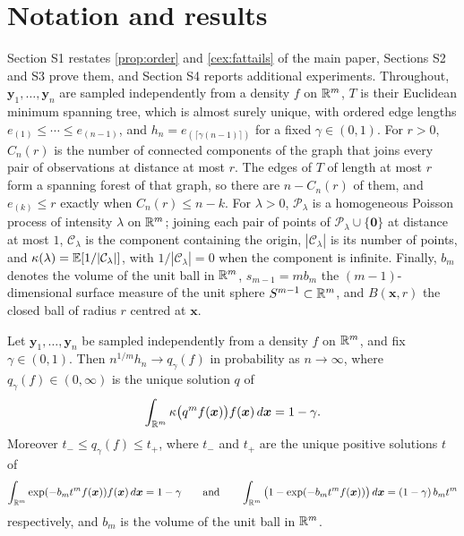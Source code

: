 \section{Notation and results}

Section S1 restates \cref{prop:order} and \cref{cex:fattails} of the main paper, Sections S2 and S3 prove them, and Section S4 reports additional experiments. Throughout, $\bm{y}_1,\dots,\bm{y}_n$ are sampled independently from a density $f$ on $\mathbb{R}^m$, $T$ is their Euclidean minimum spanning tree, which is almost surely unique, with ordered edge lengths $e_{(1)}\le\cdots\le e_{(n-1)}$, and $h_n=e_{(\lceil\gamma(n-1)\rceil)}$ for a fixed $\gamma\in(0,1)$. For $r>0$, $C_n(r)$ is the number of connected components of the graph that joins every pair of observations at distance at most $r$. The edges of $T$ of length at most $r$ form a spanning forest of that graph, so there are $n-C_n(r)$ of them, and $e_{(k)}\le r$ exactly when $C_n(r)\le n-k$. For $\lambda>0$, $\mathcal{P}_\lambda$ is a homogeneous Poisson process of intensity $\lambda$ on $\mathbb{R}^m$; joining each pair of points of $\mathcal{P}_\lambda\cup\{\bm{0}\}$ at distance at most $1$, $\mathcal{C}_\lambda$ is the component containing the origin, $|\mathcal{C}_\lambda|$ is its number of points, and $\kappa(\lambda)=\mathbb{E}[1/|\mathcal{C}_\lambda|]$, with $1/|\mathcal{C}_\lambda|=0$ when the component is infinite. Finally, $b_m$ denotes the volume of the unit ball in $\mathbb{R}^m$, $s_{m-1}=mb_m$ the $(m-1)$-dimensional surface measure of the unit sphere $S^{m-1}\subset\mathbb{R}^m$, and $B(\bm{x},r)$ the closed ball of radius $r$ centred at $\bm{x}$.

\begin{proposition}\label{prop:order}
  Let $\bm{y}_1,\dots,\bm{y}_n$ be sampled independently from a density $f$ on $\mathbb{R}^m$, and fix $\gamma\in(0,1)$. Then $n^{1/m}h_n\to q_\gamma(f)$ in probability as $n\to\infty$, where $q_\gamma(f)\in(0,\infty)$ is the unique solution $q$ of
  \begin{equation}\label{eq:qgamma}
    \int_{\mathbb{R}^m}\kappa\big(q^m f(\bm{x})\big)f(\bm{x})\,d\bm{x}=1-\gamma.
  \end{equation}
  Moreover $t_-\le q_\gamma(f)\le t_+$, where $t_-$ and $t_+$ are the unique positive solutions $t$ of
  $$
  \int_{\mathbb{R}^m}\exp(-b_m t^m f(\bm{x}))f(\bm{x})\,d\bm{x}=1-\gamma
  \qquad\text{and}\qquad
  \int_{\mathbb{R}^m}\big(1-\exp(-b_m t^m f(\bm{x}))\big)\,d\bm{x}=(1-\gamma)\,b_m t^m
  $$
  respectively, and $b_m$ is the volume of the unit ball in $\mathbb{R}^m$.
\end{proposition}

